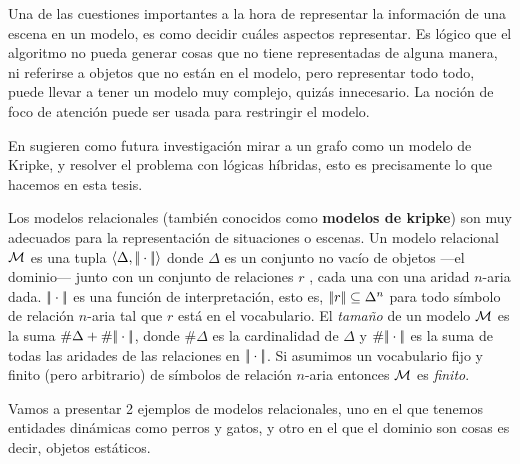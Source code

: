 Una de las cuestiones importantes a la hora de representar la informaci\'on de una escena en un modelo, es como decidir cu\'ales aspectos representar.
Es l\'ogico que el algoritmo no pueda generar cosas que no tiene representadas de alguna manera, ni referirse a objetos que no est\'an en el modelo, pero representar todo todo, puede llevar a tener un modelo muy complejo, quiz\'as innecesario. La noci\'on de foco de atenci\'on puede ser usada para restringir el modelo. %

En \cite{survey} sugieren como futura investigaci\'on mirar a un grafo como un modelo de Kripke, y resolver el problema con l\'ogicas h\'ibridas, esto es precisamente lo que hacemos en esta tesis. 

Los modelos relacionales (tambi\'en conocidos como \textbf{modelos de kripke}) son muy adecuados para la representaci\'on de situaciones o escenas. Un modelo relacional $\mathcal{M}$ es una tupla $\langle \Delta,|\!|\cdot|\!| \rangle$ donde $\Delta$ es un conjunto no vac\'io de objetos ---el dominio--- junto con un conjunto de relaciones $r$ , cada una con una aridad $n$-aria dada. $|\!|\cdot|\!|$ es una funci\'on de interpretaci\'on, esto es,
$|\!|r|\!| \subseteq \Delta^n$ para todo s\'imbolo de relaci\'on $n$-aria tal que
$r$ est\'a en el vocabulario.  El \emph{tama\~no} de un modelo $\mathcal{M}$ es la suma
$\#\Delta + \#|\!|\cdot|\!|$, donde $\#\Delta$ es la cardinalidad
de $\Delta$ y $\#|\!|\cdot|\!|$ es la suma de todas las aridades de las
relaciones en $|\!|\cdot|\!|$.
Si asumimos un vocabulario fijo y finito (pero arbitrario) de
s\'imbolos de relaci\'on $n$-aria entonces $\mathcal{M}$ es \emph{finito}. 



Vamos a presentar 2 ejemplos de modelos relacionales, uno en el que tenemos entidades din\'amicas como perros y gatos, y otro en el que el dominio son cosas es decir, objetos est\'aticos.

